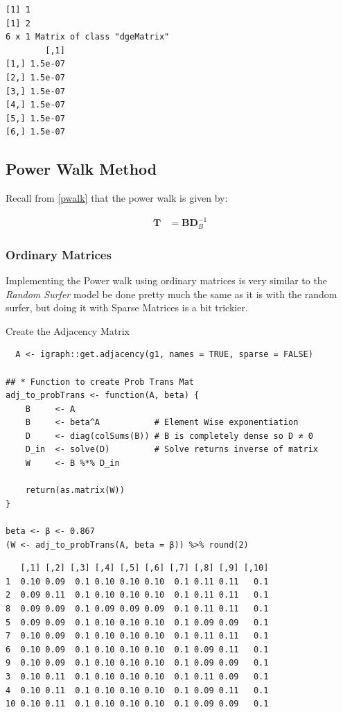 \documentclass[11pt]{article}
\begin{document}
\begin{verbatim}
[1] 1
[1] 2
6 x 1 Matrix of class "dgeMatrix"
        [,1]
[1,] 1.5e-07
[2,] 1.5e-07
[3,] 1.5e-07
[4,] 1.5e-07
[5,] 1.5e-07
[6,] 1.5e-07
\end{verbatim}

\subsection{Power Walk Method}
\label{sec:org97c1330}
Recall from \ref{pwalk} that the power walk is given by:

\begin{align*}
\mathbf{T} &= \mathbf{B} \mathbf{D}^{-1}_{B}
\end{align*}
\subsubsection{Ordinary Matrices}
\label{sec:org3f6b537}
Implementing the Power walk using ordinary matrices is very similar to the \emph{Random Surfer} model be done pretty much the same as it is with the random surfer, but doing it with Sparse Matrices is a bit trickier.

Create the Adjacency Matrix
\begin{verbatim}
  A <- igraph::get.adjacency(g1, names = TRUE, sparse = FALSE)

## * Function to create Prob Trans Mat
adj_to_probTrans <- function(A, beta) {
    B     <- A
    B     <- beta^A           # Element Wise exponentiation
    D     <- diag(colSums(B)) # B is completely dense so D ≄ 0
    D_in  <- solve(D)         # Solve returns inverse of matrix
    W     <- B %*% D_in

    return(as.matrix(W))
}

beta <- β <- 0.867
(W <- adj_to_probTrans(A, beta = β)) %>% round(2)
\end{verbatim}

\begin{verbatim}
   [,1] [,2] [,3] [,4] [,5] [,6] [,7] [,8] [,9] [,10]
1  0.10 0.09  0.1 0.10 0.10 0.10  0.1 0.11 0.11   0.1
2  0.09 0.11  0.1 0.10 0.10 0.10  0.1 0.11 0.11   0.1
8  0.09 0.09  0.1 0.09 0.09 0.09  0.1 0.11 0.11   0.1
5  0.09 0.09  0.1 0.10 0.10 0.10  0.1 0.09 0.09   0.1
7  0.10 0.09  0.1 0.10 0.10 0.10  0.1 0.11 0.11   0.1
6  0.10 0.09  0.1 0.10 0.10 0.10  0.1 0.09 0.11   0.1
9  0.10 0.09  0.1 0.10 0.10 0.10  0.1 0.09 0.09   0.1
3  0.10 0.11  0.1 0.10 0.10 0.10  0.1 0.11 0.09   0.1
4  0.10 0.11  0.1 0.10 0.10 0.10  0.1 0.09 0.11   0.1
10 0.10 0.11  0.1 0.10 0.10 0.10  0.1 0.09 0.09   0.1
\end{verbatim}
\end{document}
